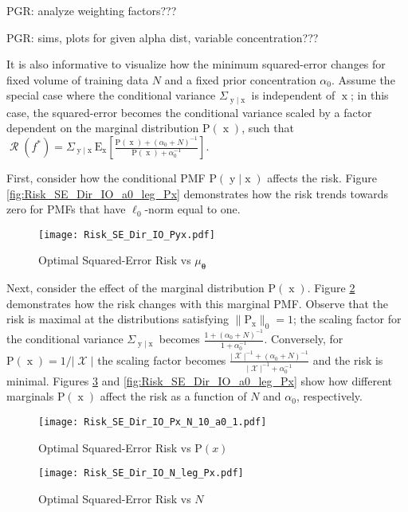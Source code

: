 \documentclass[12pt]{report}
\DeclareMathOperator{\xrm}{\mathrm{x}}
\DeclareMathOperator{\yrm}{\mathrm{y}}
\DeclareMathOperator{\Xcal}{\mathcal{X}}
\DeclareMathOperator{\Rcal}{\mathcal{R}}
\begin{document}
PGR: analyze weighting factors???

PGR: sims, plots for given alpha dist, variable concentration???

It is also informative to visualize how the minimum squared-error changes for fixed volume of training data $N$ and a fixed prior concentration $\alpha_0$. Assume the special case where the conditional variance $\Sigma_{\yrm | \xrm}$ is independent of $\xrm$; in this case, the squared-error becomes the conditional variance scaled by a factor dependent on the marginal distribution $\text{P}(\xrm)$, such that $\Rcal(f^*) = \Sigma_{\yrm | \xrm} \text{E}_{\xrm} \left[ \frac{\text{P}(\xrm) + (\alpha_0+N)^{-1}}{\text{P}(\xrm) + \alpha_0^{-1}} \right]$.

First, consider how the conditional PMF $\text{P}(\yrm | \xrm)$ affects the risk. Figure \ref{fig:Risk_SE_Dir_IO_a0_leg_Px} demonstrates how the risk trends towards zero for PMFs that have $\ell_0$-norm equal to one.

\begin{figure}
\centering
\texttt{[image: Risk\_SE\_Dir\_IO\_Pyx.pdf]}
\caption{Optimal Squared-Error Risk vs $\mu_{\bm{\theta}}$}
\label{fig:Risk_SE_Dir_IO_Pyx}
\end{figure}

Next, consider the effect of the marginal distribution $\text{P}(\xrm)$. Figure \ref{fig:Risk_SE_Dir_IO_Px_N_10_a0_1} demonstrates how the risk changes with this marginal PMF. Observe that the risk is maximal at the distributions satisfying $\| \text{P}_{\xrm} \|_0 = 1$; the scaling factor for the conditional variance $\Sigma_{\yrm | \xrm}$ becomes $\frac{1 + (\alpha_0+N)^{-1}}{1 + \alpha_0^{-1}}$. Conversely, for $\text{P}(\xrm) = 1/|\Xcal|$ the scaling factor becomes $\frac{|\Xcal|^{-1} + (\alpha_0+N)^{-1}}{|\Xcal|^{-1} + \alpha_0^{-1}}$ and the risk is minimal. Figures \ref{fig:Risk_SE_Dir_IO_N_leg_Px} and \ref{fig:Risk_SE_Dir_IO_a0_leg_Px} show how different marginals $\text{P}(\xrm)$ affect the risk as a function of $N$ and $\alpha_0$, respectively.

\begin{figure}
\centering
\texttt{[image: Risk\_SE\_Dir\_IO\_Px\_N\_10\_a0\_1.pdf]}
\caption{Optimal Squared-Error Risk vs $\text{P}(x)$}
\label{fig:Risk_SE_Dir_IO_Px_N_10_a0_1}
\end{figure}

\begin{figure}
\centering
\texttt{[image: Risk\_SE\_Dir\_IO\_N\_leg\_Px.pdf]}
\caption{Optimal Squared-Error Risk vs $N$}
\label{fig:Risk_SE_Dir_IO_N_leg_Px}
\end{figure}
\end{document}
